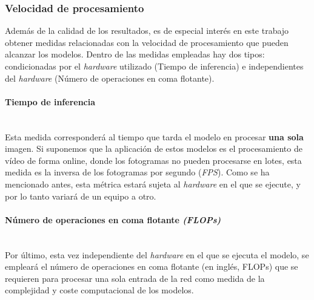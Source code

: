 \subsubsection{Velocidad de procesamiento}
Además de la calidad de los resultados, es de especial interés en este trabajo obtener medidas relacionadas con la velocidad de procesamiento que pueden alcanzar los modelos. Dentro de las medidas empleadas hay dos tipos: condicionadas por el \textit{hardware} utilizado (Tiempo de inferencia) e independientes del \textit{hardware} (Número de operaciones en coma flotante).


\paragraph{Tiempo de inferencia}\mbox{}\\
Esta medida corresponderá al tiempo que tarda el modelo en procesar \textbf{una sola} imagen. Si suponemos que la aplicación de estos modelos es el procesamiento de vídeo de forma online, donde los fotogramas no pueden procesarse en lotes, esta medida es la inversa de los fotogramas por segundo (\textit{FPS}). 
Como se ha mencionado antes, esta métrica estará sujeta al \textit{hardware} en el que se ejecute, y por lo tanto variará de un equipo a otro.


\paragraph{Número de operaciones en coma flotante \textit{(FLOPs)}}\mbox{}\\
Por último, esta vez independiente del \textit{hardware} en el que se ejecuta el modelo, se empleará el número de operaciones en coma flotante (en inglés, FLOPs) que se requieren para procesar una sola entrada de la red como medida de la complejidad y coste computacional de los modelos.

